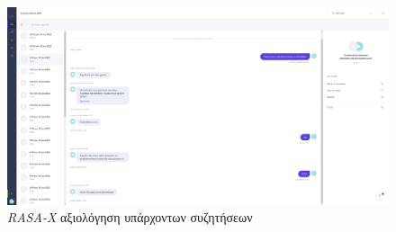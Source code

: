 \begin{figure}[!ht]
  \centering
  \captionsetup{justification=centering}
  \includegraphics[width=1\textwidth]{images/appendix/rasax-conversation-review.png}
  \caption{\emph{RASA-X} αξιολόγηση υπάρχοντων συζητήσεων}
  \label{fig:rasax-conversation-review}
\end{figure}
\noindent